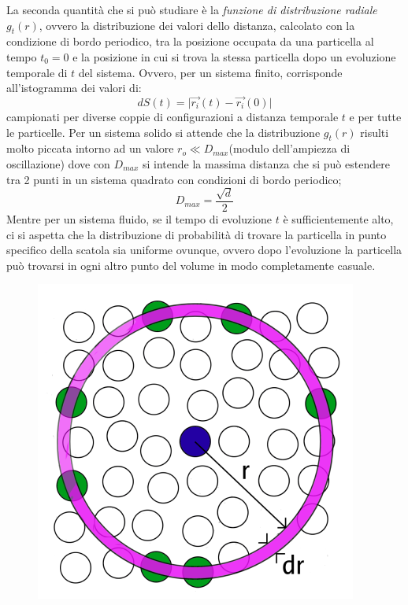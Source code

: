 \documentclass[11pt]{article}
\theoremstyle{plain}
\theoremstyle{remark}
\begin{document}
\begin{itemize}
La seconda quantità che si può studiare è la \emph{funzione di distribuzione radiale} $g_t(r)$, ovvero la distribuzione dei valori dello distanza, calcolato con la condizione di bordo periodico, tra la posizione occupata da una particella al tempo $t_0=0$ e la posizione in cui si trova la stessa particella dopo un evoluzione temporale di $t$ del sistema. Ovvero, per un sistema finito, corrisponde all'istogramma dei valori di:
\begin{equation}
dS(t) = \big\vert \vec{r_i}(t) - \vec{r_i}(0) \big\vert
\end{equation}
campionati per diverse coppie di configurazioni a distanza temporale $t$ e per tutte le particelle.
\newline
Per un sistema solido si attende che la distribuzione $g_t(r)$ risulti molto piccata intorno ad un valore $r_o\ll D_{max}$(modulo dell'ampiezza di oscillazione) dove con $D_{max}$ si intende la massima distanza che si può estendere tra 2 punti in un sistema quadrato con condizioni di bordo periodico;
\begin{equation}
D_{max}= \frac{\sqrt{d}}{2}
\end{equation}
Mentre per un sistema fluido, se il tempo di evoluzione $t$ è sufficientemente alto, ci si aspetta che la distribuzione di probabilità di trovare la particella in punto specifico della scatola sia uniforme ovunque, ovvero dopo l'evoluzione la particella può trovarsi in ogni altro punto del volume in modo completamente casuale.
	\begin{figure}
		\centering
		\includegraphics[scale=0.5]{Immagini/RDF.png}

\end{figure}
\end{itemize}
\end{document}
